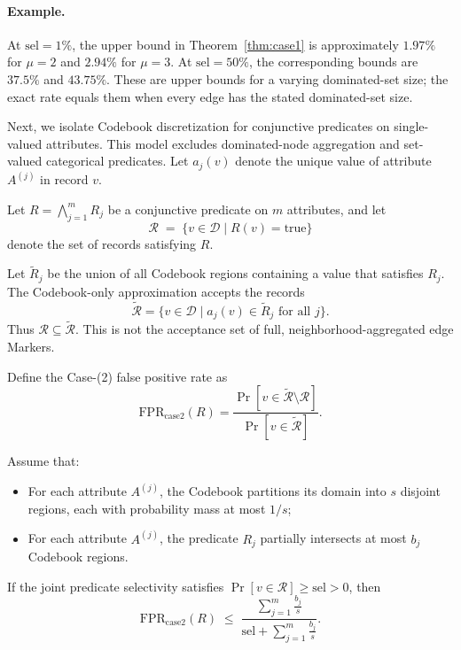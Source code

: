 \paragraph{Example.}
At $\mathrm{sel}=1\%$, the upper bound in Theorem~\ref{thm:case1} is
approximately $1.97\%$ for $\mu=2$ and $2.94\%$ for $\mu=3$.
At $\mathrm{sel}=50\%$, the corresponding bounds are $37.5\%$ and $43.75\%$.
These are upper bounds for a varying dominated-set size; the exact rate equals
them when every edge has the stated dominated-set size.


Next, we isolate Codebook discretization for conjunctive predicates on
single-valued attributes.
This model excludes dominated-node aggregation and set-valued categorical
predicates.
Let $a_j(v)$ denote the unique value of attribute $A^{(j)}$ in record $v$.

Let $R=\bigwedge_{j=1}^{m} R_j$ be a conjunctive predicate on $m$ attributes,
and let
\[
\mathcal{R} \;=\; \{v \in \mathcal D  \mid R(v)=\text{true}\}
\]
denote the set of records satisfying $R$.

Let $\widetilde R_j$ be the union of all Codebook regions containing a value that
satisfies $R_j$.
The Codebook-only approximation accepts the records
\[
\widetilde{\mathcal R}
=
\{v \in \mathcal D \mid a_j(v)\in\widetilde R_j \text{ for all }j\}.
\]
Thus $\mathcal R\subseteq\widetilde{\mathcal R}$.
This is not the acceptance set of full, neighborhood-aggregated edge Markers.

Define the Case-(2) false positive rate as
\[
\mathrm{FPR}_{\mathrm{case2}}(R)
=
\frac{\Pr[v \in \widetilde{\mathcal R} \setminus \mathcal R]}
{\Pr[v \in \widetilde{\mathcal R}]}.
\]

\begin{theorem}
\label{thm:case2-main}


Assume that:
\begin{itemize}
  \item[(i)] For each attribute $A^{(j)}$, the Codebook partitions its domain into $s$ disjoint regions,
  each with probability mass at most $1/s$;
  \item[(ii)] For each attribute $A^{(j)}$, the predicate $R_j$ partially intersects at most $b_j$
  Codebook regions.
\end{itemize}

If the joint predicate selectivity satisfies $\Pr[v \in \mathcal R] \ge \mathrm{sel}>0$, then
\[
\mathrm{FPR}_{\mathrm{case2}}(R)
\;\le\;
\frac{\sum_{j=1}^{m} \frac{b_j}{s}}
{\mathrm{sel} + \sum_{j=1}^{m} \frac{b_j}{s}}.
\]

\end{theorem}

